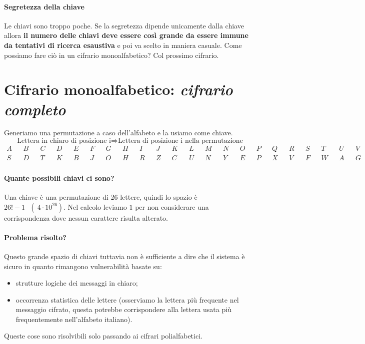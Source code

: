 \paragraph{Segretezza della chiave} Le chiavi sono troppo poche. Se la segretezza dipende unicamente dalla chiave allora \textbf{il numero delle chiavi deve essere così grande da essere immune da tentativi di ricerca esaustiva} e poi va scelto in maniera casuale. Come possiamo fare ciò in un cifrario monoalfabetico? Col prossimo cifrario.


\section{Cifrario monoalfabetico: \emph{cifrario completo}}
Generiamo una permutazione a caso dell'alfabeto e la usiamo come chiave.
$$ \text{Lettera in chiaro di posizione i} \Longrightarrow \text{Lettera di posizione i nella permutazione} $$
\small 
\begin{align*}
	A&&B&&C&&D&&E&&F&&G&&H&&I&&J&&K&&L&&M&&N&&O&&P&&Q&&R&&S&&T&&U&&V&&W&&X&&Y&&Z\\
	S&&D&&T&&K&&B&&J&&O&&H&&R&&Z&&C&&U&&N&&Y&&E&&P&&X&&V&&F&&W&&A&&G&&Q&&I&&L&&M
\end{align*}
\normalsize 
\paragraph{Quante possibili chiavi ci sono?} Una chiave è una permutazione di 26 lettere, quindi lo spazio è $26! - 1 \text{ } (~4 \cdot 10^{26})$. Nel calcolo leviamo $1$ per non considerare una corrispondenza dove nessun carattere risulta alterato.
\paragraph{Problema risolto?} Questo grande spazio di chiavi tuttavia non è sufficiente a dire che il sistema è sicuro in quanto rimangono vulnerabilità basate su:
\begin{itemize}
    \item strutture logiche dei messaggi in chiaro;
    \item occorrenza statistica delle lettere (osserviamo la lettera più frequente nel messaggio cifrato, questa potrebbe corrispondere alla lettera usata più frequentemente nell'alfabeto italiano).
\end{itemize}
Queste cose sono risolvibili solo passando ai cifrari polialfabetici. 


